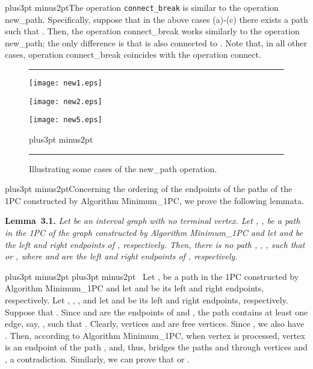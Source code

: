 \documentclass[10pt]{article}
\def\yskip{\penalty-50\vskip3pt plus3pt minus2pt}
\def\y{\yskip}
\def\yy{\yskip\yskip}
\def\qed{\hskip 3pt\vrule height 6pt width 3pt depth 0pt}
\def\s{\ }
\begin{document}
{\y The operation {\tt connect\_break} is similar to the operation
new\_path. Specifically, suppose that in the above cases (a)-(c)
there exists a path  such that
. Then, the operation connect\_break works
similarly to the operation new\_path; the only difference is that
 is also connected to . Note that, in all other cases,
operation connect\_break coincides with the operation connect.

\begin{figure}[t]
\hrule \bigskip \hspace*{0.6in}
   \begin{minipage}[l]{2in}
\texttt{[image: new1.eps]}
\end{minipage}
\vspace{0.2in}

\hspace*{0.6in}
  \begin{minipage}[r]{2in}
    \texttt{[image: new2.eps]}
\end{minipage}
\vspace{0.2in}

\hspace*{0.6in}
  \begin{minipage}[c]{2in}
   \texttt{[image: new5.eps]}
\end{minipage}

    \y\caption{\small{Illustrating some cases of the new\_path operation.}}
\bigskip \hrule
 \label{newOP}
\end{figure}



\y Concerning the ordering of the endpoints of the paths of the
1PC constructed by Algorithm Minimum\_1PC, we prove the following
lemmata.

\medskip
\par\noindent
{\bf Lemma~3.1.} {\it Let  be an interval graph with no
terminal vertex. Let , ,
be a path in the 1PC  of the graph
 constructed by Algorithm Minimum\_1PC and let  and 
be the left and right endpoints of , respectively. Then,
there is no path , , , such that  or
, where  and  are the left and right
endpoints of , respectively.}

\yy {} \s Let ,  be a path in the 1PC
 constructed by Algorithm
Minimum\_1PC and let  and  be its left and right
endpoints, respectively. Let , , , and let  and  be its
left and right endpoints, respectively. Suppose that
. Since  and  are the endpoints of 
and , the path  contains at least one edge, say,
, such that . Clearly, vertices  and
 are free vertices. Since , we also have
. Then, according to Algorithm Minimum\_1PC, when
vertex  is processed, vertex  is an endpoint of the path
, and, thus,  bridges the paths  and  through
vertices  and , a contradiction. Similarly, we can prove
that  or . \ \qed

}
\end{document}
